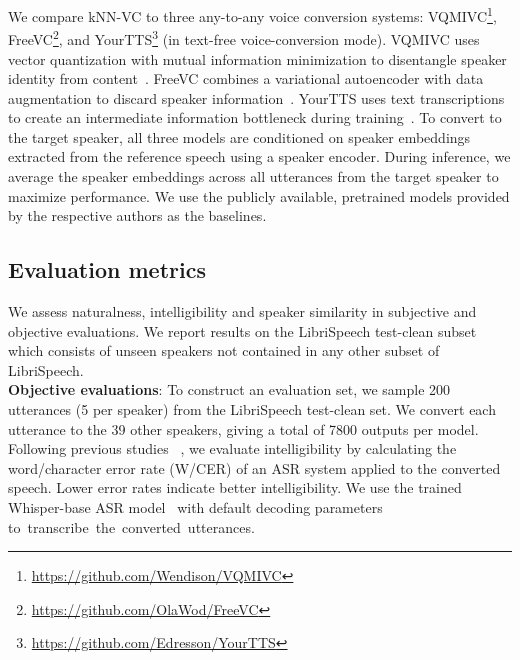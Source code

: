 \documentclass{INTERSPEECH2023}
\def\modelname{{kNN-VC}}
\begin{document}
We compare \modelname{} to three any-to-any voice conversion systems: 
VQMIVC\footnote{\scriptsize \url{https://github.com/Wendison/VQMIVC}}, 
FreeVC\footnote{\scriptsize \url{https://github.com/OlaWod/FreeVC}}, and YourTTS\footnote{\scriptsize \url{https://github.com/Edresson/YourTTS}} (in text-free voice-conversion mode).
VQMIVC uses vector quantization with mutual information 
minimization
to disentangle speaker identity from content~\cite{vqmivc_wang21n_interspeech}.
FreeVC combines a variational autoencoder with data augmentation to discard speaker information~\cite{freevc}.
YourTTS uses text transcriptions to create an intermediate information bottleneck during training~\cite{yourtts_v162-casanova22a}.
To convert to the target speaker, all three models are conditioned on speaker embeddings extracted from the reference speech using a speaker encoder.
During inference, we average the speaker embeddings across all utterances from the target speaker to maximize performance.
We use the publicly available, pretrained models provided by the respective authors as the baselines.

\subsection{Evaluation metrics}

We assess naturalness, intelligibility and speaker similarity in subjective and objective evaluations.
We report results on the LibriSpeech test-clean subset which consists of unseen speakers not contained in any other subset of LibriSpeech.\\


\noindent\textbf{Objective evaluations}:
To construct an evaluation set, we sample 200 utterances (5 per speaker) from the LibriSpeech test-clean set. 
We convert each utterance to the 39 other speakers, giving a total of 7800 outputs per model.
Following previous studies~ \cite{vcc2020,vqmivc_wang21n_interspeech,vc_categories_liu2021any}, we evaluate  intelligibility by calculating the word/character error rate (W/CER) of
an ASR system applied to the converted speech.
Lower error rates indicate better intelligibility.
We use the trained Whisper-base ASR model~\cite{whisper_radford2022robust} with default decoding parameters \mbox{to transcribe the converted utterances.}
\end{document}
